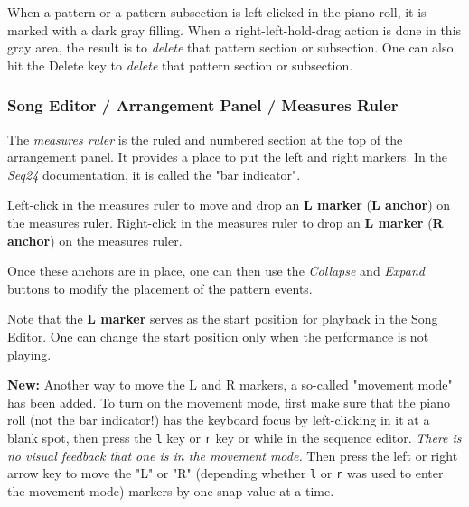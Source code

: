    When a pattern or a pattern subsection is left-clicked in the piano
   roll, it is marked with a dark gray filling.
   When a right-left-hold-drag action is done in this gray area, the result
   is to \textsl{delete} that pattern section or subsection.
   One can also hit the Delete key to \textsl{delete} that pattern section
   or subsection.

\subsubsection{Song Editor / Arrangement Panel / Measures Ruler}
\label{subsubsec:seq64_song_editor_arrangement_panel_measures_ruler}

   The \textsl{measures ruler} is the ruled and numbered section at the top
   of the arrangement panel.  It provides a place to put the left and right
   markers.  In the \textsl{Seq24} documentation, it is called the "bar
   indicator".

   Left-click in the measures ruler to move and drop an
   \textbf{L marker} (\textbf{L anchor}) on the measures ruler.
   Right-click in the measures ruler to drop an
   \textbf{L marker} (\textbf{R anchor}) on the measures ruler.

   Once these anchors are in place, one can then use
	the \textsl{Collapse} and \textsl{Expand} buttons to modify the
   placement of the pattern events.

   Note that the \textbf{L marker} serves as the start position for playback
   in the Song Editor.  One can change the start position only when the
   performance is not playing.

   \textbf{New:}
   Another way to move the L and R markers, a so-called "movement mode"
   has been added.
   To turn on the movement mode, first make sure that the piano roll (not the
   bar indicator!) has the
   keyboard focus by left-clicking in it at a blank spot, then press the
   \texttt{l} key or
   \texttt{r} key or
   while in the sequence editor.
   \textsl{There is no visual feedback that one is in the movement mode.}
   Then press the left or right arrow key to move the "L" or "R" (depending
   whether \texttt{l} or \texttt{r} was used to enter the movement mode)
   markers by one snap value at a time.

